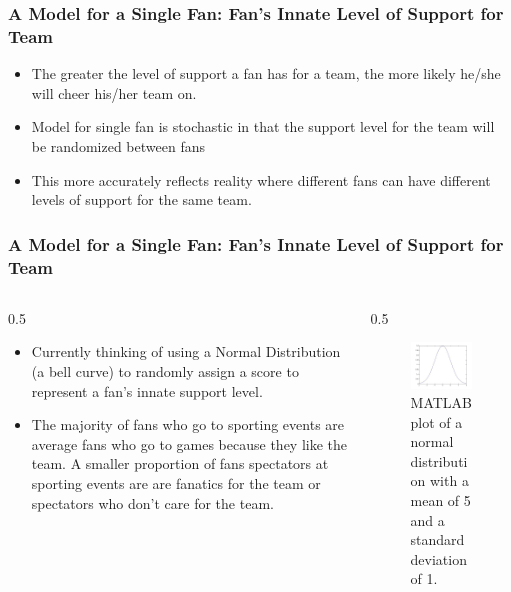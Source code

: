 \documentclass[compress,handout,10pt]{beamer}
\let\olditem\item
\renewcommand{\item}{\setlength{\itemsep}{0.5\baselineskip}\olditem}
\begin{document}
\begin {frame}
	\frametitle{A Model for a Single Fan: Fan's Innate Level of Support for Team}
	\begin{itemize}
		\item The greater the level of support a fan has for a team, the more likely he/she will cheer his/her team on.
		\item Model for single fan is stochastic in that the support level for the team will be randomized between fans
		\item This more accurately reflects reality where different fans can have different levels of support for the same team.
	\end{itemize}
\end {frame}

\begin{frame}
	\frametitle{A Model for a Single Fan: Fan's Innate Level of Support for Team}
	\begin {columns}
		\begin {column} {0.5\textwidth}
			\begin{itemize}
				\item Currently thinking of using a Normal Distribution (a bell curve) to randomly assign a score to represent a fan's innate support level.
				\item The majority of fans who go to sporting events are average fans who go to games because they like the team. A smaller proportion of fans spectators at sporting events are are fanatics for the team or spectators who don't care for the team.
			\end{itemize}
		\end {column}
		\begin {column} {0.5\textwidth}
		\begin{figure}
		\begin{center}
			\includegraphics [width=2in] {NormDistribution.jpg}
			\caption{{\scriptsize MATLAB plot of a normal distribution with a mean of 5 and a standard deviation of 1.}}
		\end{center}
		\end{figure}
		\end {column}
	\end {columns}	
\end{frame}
\end{document}
